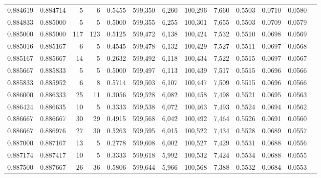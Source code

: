 \begin{tabular}{rrrrrrrrrrrrr}
0.884619 & 0.884714 &     5 &   6 &                                     0.5455 & 599,350 &   6,260 & 100,296 &   7,660 & 0.5503 & 0.0710 & 0.0580 \\
0.884833 & 0.885000 &     5 &   5 &                                     0.5000 & 599,355 &   6,255 & 100,301 &   7,655 & 0.5503 & 0.0709 & 0.0579 \\
0.885000 & 0.885000 &   117 & 123 &                                     0.5125 & 599,472 &   6,138 & 100,424 &   7,532 & 0.5510 & 0.0698 & 0.0569 \\
0.885016 & 0.885167 &     6 &   5 &                                     0.4545 & 599,478 &   6,132 & 100,429 &   7,527 & 0.5511 & 0.0697 & 0.0568 \\
0.885167 & 0.885667 &    14 &   5 &                                     0.2632 & 599,492 &   6,118 & 100,434 &   7,522 & 0.5515 & 0.0697 & 0.0567 \\
0.885667 & 0.885833 &     5 &   5 &                                     0.5000 & 599,497 &   6,113 & 100,439 &   7,517 & 0.5515 & 0.0696 & 0.0566 \\
0.885833 & 0.885952 &     6 &   8 &                                     0.5714 & 599,503 &   6,107 & 100,447 &   7,509 & 0.5515 & 0.0696 & 0.0566 \\
0.886000 & 0.886333 &    25 &  11 &                                     0.3056 & 599,528 &   6,082 & 100,458 &   7,498 & 0.5521 & 0.0695 & 0.0563 \\
0.886424 & 0.886635 &    10 &   5 &                                     0.3333 & 599,538 &   6,072 & 100,463 &   7,493 & 0.5524 & 0.0694 & 0.0562 \\
0.886667 & 0.886667 &    30 &  29 &                                     0.4915 & 599,568 &   6,042 & 100,492 &   7,464 & 0.5526 & 0.0691 & 0.0560 \\
0.886667 & 0.886976 &    27 &  30 &                                     0.5263 & 599,595 &   6,015 & 100,522 &   7,434 & 0.5528 & 0.0689 & 0.0557 \\
0.887000 & 0.887167 &    13 &   5 &                                     0.2778 & 599,608 &   6,002 & 100,527 &   7,429 & 0.5531 & 0.0688 & 0.0556 \\
0.887174 & 0.887417 &    10 &   5 &                                     0.3333 & 599,618 &   5,992 & 100,532 &   7,424 & 0.5534 & 0.0688 & 0.0555 \\
0.887500 & 0.887667 &    26 &  36 &                                     0.5806 & 599,644 &   5,966 & 100,568 &   7,388 & 0.5532 & 0.0684 & 0.0553 \\

\end{tabular}
